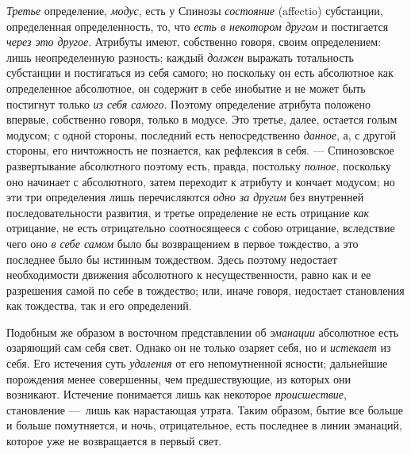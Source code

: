 {\em Третье} определение,
{\em модус}, есть у Спинозы
{\em состояние} (affectio) субстанции, определенная
определенность, то, что {\em есть в некотором другом} и
постигается {\em через это другое}. Атрибуты имеют,
собственно говоря, своим определением: лишь неопределенную разность; каждый
{\em должен} выражать тотальность субстанции и
постигаться из себя самого; но поскольку он есть абсолютное как
определенное абсолютное, он содержит в себе инобытие и не может быть
постигнут только {\em из себя самого}. Поэтому
определение атрибута положено впервые, собственно говоря, только в модусе.
Это третье, далее, остается голым модусом; с одной стороны, последний есть
непосредственно {\em данное}, а, с другой стороны, его
ничтожность не познается, как рефлексия в себя. — Спинозовское
развертывание абсолютного поэтому есть, правда, постольку
{\em полное}, поскольку оно начинает с абсолютного,
затем переходит к атрибуту и кончает модусом; но эти три определения лишь
перечисляются {\em одно за другим} без внутренней
последовательности развития, и третье определение не есть отрицание
{\em как} отрицание, не есть отрицательно соотносящееся
с собою отрицание, вследствие чего оно {\em в себе
самом} было бы возвращением в первое тождество, а это последнее было бы
истинным тождеством. Здесь поэтому недостает необходимости движения
абсолютного к несущественности, равно как и ее разрешения самой по себе в
тождество; или, иначе говоря, недостает становления как тождества, так и
его определений.

Подобным же образом в восточном представлении об
{\em эманации} абсолютное есть озаряющий сам себя свет.
Однако он не только озаряет себя, но и {\em истекает}
из себя. Его истечения суть {\em удаления} от его
непомутненной ясности; дальнейшие порождения менее совершенны, чем
предшествующие, из которых они возникают. Истечение понимается лишь как
некоторое {\em происшествие}, становление —~лишь как
нарастающая утрата. Таким образом, бытие все больше и больше помутняется, и
ночь, отрицательное, есть последнее в линии эманаций, которое уже не
возвращается в первый свет.

